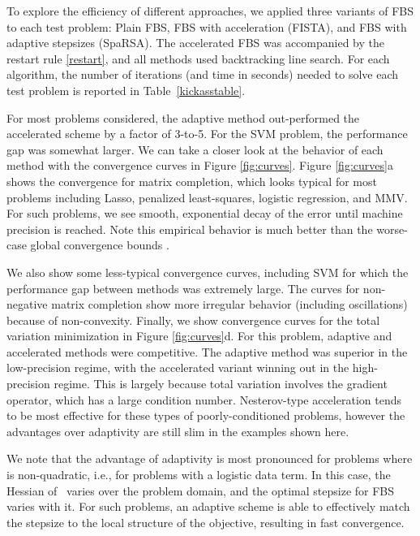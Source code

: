 \documentclass{amsart}
\theoremstyle{definition}
\begin{document}
To explore the efficiency of different approaches, we applied three variants of FBS to each test problem:  Plain FBS, FBS with acceleration (FISTA), and FBS with adaptive stepsizes (SpaRSA).   The accelerated FBS was accompanied by the restart rule \eqref{restart}, and all methods used backtracking line search. 
For each algorithm, the number of iterations (and time in seconds) needed to solve each test problem is reported in Table~\ref{kickasstable}.   

 For most problems considered,  the adaptive method out-performed the accelerated scheme by a factor of 3-to-5. For the SVM problem, the performance gap was somewhat larger.    We can take a closer look at the behavior of each method with the convergence curves in Figure \ref{fig:curves}.  Figure \ref{fig:curves}a shows the convergence for matrix completion, which looks typical for most problems including Lasso, penalized least-squares, logistic regression, and MMV.  For such problems, we see smooth, exponential decay of the error until machine precision is reached.  Note this empirical behavior is much better than the   worse-case global convergence bounds \cite{BT09}. 
 
 We also show some less-typical convergence curves, including SVM for which the performance gap between methods was extremely large.  The curves for non-negative matrix completion show more irregular behavior (including oscillations) because of non-convexity.   Finally, we show convergence curves for the total variation minimization in Figure \ref{fig:curves}d.  For this problem, adaptive and accelerated methods were competitive.  The adaptive method was superior in the low-precision regime, with the accelerated variant winning out in the high-precision regime.  This is largely because total variation involves the gradient operator, which has a large condition number.  Nesterov-type acceleration tends to be most effective for these types of poorly-conditioned problems, however the advantages over adaptivity are still slim in the examples shown here.

We note that the advantage of adaptivity is most pronounced for problems where  is non-quadratic, i.e., for problems with a logistic data term.  In this case, the Hessian of~ varies over the problem domain, and the optimal stepsize for FBS varies with it.  For such problems, an adaptive scheme is able to effectively match the stepsize to the local structure of the objective, resulting in fast convergence.
\end{document}
